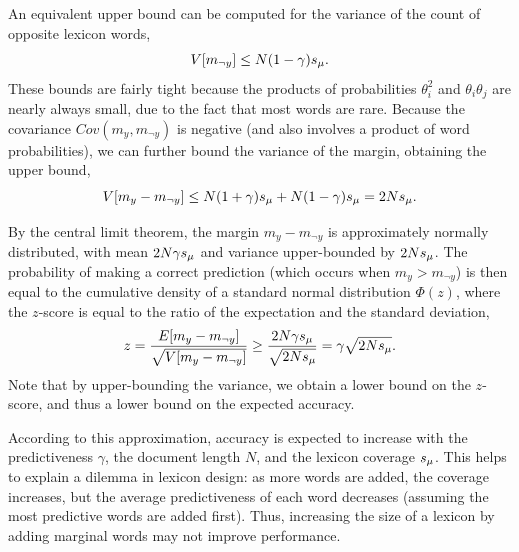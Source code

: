 An equivalent upper bound can be computed for the variance of the count of opposite lexicon words, 
\begin{equation}
V[m_{\neg y}] \leq N(1-\gamma)s_{\mu}.
\end{equation}
These bounds are fairly tight because the products of probabilities $\theta_i^2$ and $\theta_i \theta_j$ are nearly always small, due to the fact that most words are rare. Because the covariance $Cov(m_y,m_{\neg y})$ is negative (and also involves a product of word probabilities), we can further bound the variance of the margin, obtaining the upper bound,
\begin{equation}
V[m_y - m_{\neg y}] \leq N (1+\gamma)s_{\mu} + N(1-\gamma)s_{\mu}
= 2 N s_{\mu}.
\end{equation}

By the central limit theorem, the margin $m_y - m_{\neg y}$ is approximately normally distributed, with mean $2N\gamma s_{\mu}$ and variance upper-bounded by $2Ns_{\mu}$. The probability of making a correct prediction (which occurs when $m_y > m_{\neg y}$) is then equal to the cumulative density of a standard normal distribution $\Phi(z)$, where the $z$-score is equal to the ratio of the expectation and the standard deviation,
\begin{align}
z = \frac{E[m_y - m_{\neg y}]}{\sqrt{V[m_y - m_{\neg y}]}} 
\geq \frac{2N\gamma s_{\mu}}{\sqrt{2Ns_{\mu}}}
= \gamma \sqrt{2Ns_{\mu}}.
\end{align}
Note that by upper-bounding the variance, we obtain a lower bound on the $z$-score, and thus a lower bound on the expected accuracy.

According to this approximation, accuracy is expected to increase with the predictiveness $\gamma$, the document length $N$, and the lexicon coverage $s_{\mu}$. This helps to explain a dilemma in lexicon design: as more words are added, the coverage increases, but the average predictiveness of each word decreases (assuming the most predictive words are added first). Thus, increasing the size of a lexicon by adding marginal words may not improve performance. 

